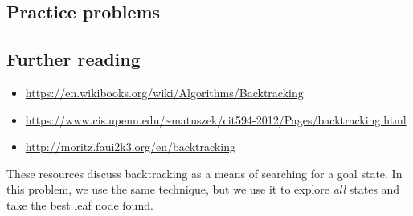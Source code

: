 \subsection*{Practice problems}

\subsection*{Further reading}

\begin{itemize}
\item \url{https://en.wikibooks.org/wiki/Algorithms/Backtracking}
\item \url{https://www.cis.upenn.edu/~matuszek/cit594-2012/Pages/backtracking.html}
\item \url{http://moritz.faui2k3.org/en/backtracking}
\end{itemize}

These resources discuss backtracking as a means of searching for a goal state. In this problem, we use the same technique, but we use it to explore \textit{all} states and take the best leaf node found.
